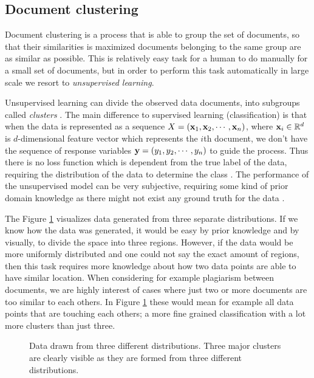\subsection{Document clustering}

Document clustering is a process that is able to group the set of documents, so that their similarities is maximized \ie documents belonging to the same group are as similar as possible. This is relatively easy task for a human to do manually for a small set of documents, but in order to perform this task automatically in large scale we resort to \emph{unsupervised learning}. 

Unsupervised learning can divide the observed data \ie documents, into subgroups called \emph{clusters} \cite{hastie_09_elements-of.statistical-learning}. The main difference to supervised learning (classification) is that when the data is represented as a sequence $X = (\mathbf{x}_1, \mathbf{x}_2, \cdots, \mathbf{x}_n)$, where $\mathbf{x}_i \in \mathbb{R}^d$ is $d$-dimensional feature vector which represents the $i$th document, we don't have the sequence of response variables $\mathbf{y} = (y_1, y_2, \cdots, y_n)$ to guide the process. Thus there is no loss function which is dependent from the true label of the data, requiring the distribution of the data to determine the class \cite{Manning:2008:IIR:1394399}. The performance of the unsupervised model can be very subjective, requiring some kind of prior domain knowledge as there might not exist any ground truth for the data \cite{hastie_09_elements-of.statistical-learning}. 

The Figure \ref{fig-clust-example} visualizes data generated from three separate distributions. If we know how the data was generated, it would be easy by prior knowledge and by visually, to divide the space into three regions. However, if the data would be more uniformly distributed and one could not say the exact amount of regions, then this task requires more knowledge about how two data points are able to have similar location. When considering for example plagiarism between documents, we are highly interest of cases where just two or more documents are too similar to each others. In Figure \ref{fig-clust-example} these would mean for example all data points that are touching each others; a more fine grained classification with a lot more clusters than just three. 

\begin{figure}[!h]
\centering
\setlength\figureheight{7cm}
\setlength\figurewidth{7cm}

\caption{Data drawn from three different distributions. Three major clusters are clearly visible as they are formed from three different distributions.} \label{fig-clust-example}
\end{figure}

